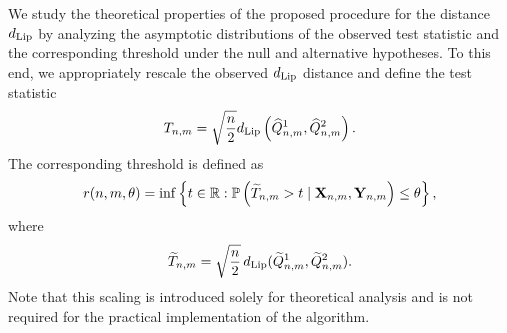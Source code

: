 We study the theoretical properties of the proposed procedure for the distance $d_{\mathrm{Lip}}$ by analyzing the asymptotic distributions of the observed test statistic and the corresponding threshold under the null and alternative hypotheses. To this end, we appropriately rescale the observed $d_{\mathrm{Lip}}$ distance and define the test statistic
\[
T_{n,m} = \sqrt{\frac{n}{2}}d_{\mathrm{Lip}}\left( \widehat{Q}^1_{n,m}, \widehat{Q}^2_{n,m} \right).
\]
The corresponding threshold is defined as
\begin{equation}\label{definition:permutation_threshold}
r(n,m,\theta) = \inf \left\{ t \in \mathbb{R} : \mathbb{P}\left(\widetilde{T}_{n,m} > t \mid \mathbf{X}_{n,m},\mathbf{Y}_{n,m} \right) \leq \theta \right\},
\end{equation}
where 
\[
\widetilde{T}_{n,m} = \sqrt{\frac{n}{2}} \, d_{\mathrm{Lip}}(\widetilde{Q}^1_{n,m}, \widetilde{Q}^2_{n,m}).
\]
Note that this scaling is introduced solely for theoretical analysis and is not required for the practical implementation of the algorithm.

